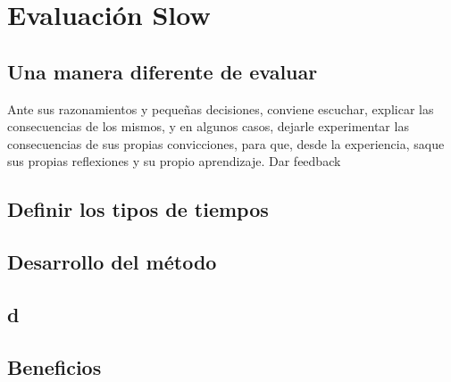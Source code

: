 \chapter{Evaluaci\'on Slow}
\section{Una manera diferente de evaluar}

Ante sus razonamientos y pequeñas decisiones, conviene escuchar, explicar las consecuencias de los mismos, y en algunos casos, dejarle experimentar las 
consecuencias de sus propias convicciones, para que, desde la experiencia, saque sus propias reflexiones y su propio aprendizaje.
Dar feedback
\section{Definir los tipos de tiempos}
\section{Desarrollo del método}
\section{d}
\section{Beneficios}